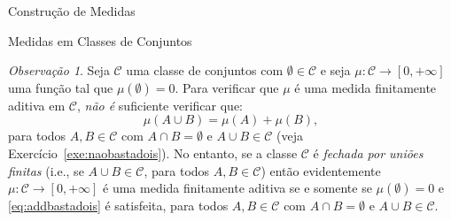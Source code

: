 \documentclass[oneside,final,11pt]{amsbook}
\theoremstyle{remark}\newtheorem{exercise}{Exercício}[chapter]
\theoremstyle{remark}\newtheorem{*exercise}[exercise]{\hbox to 0pt{\hskip 0pt minus 1fil*}Exercício}
\theoremstyle{definition}\newtheorem{exdefin}{Definição}[chapter]
\theoremstyle{plain}\newtheorem{teo}{Teorema}[section]
\theoremstyle{plain}\newtheorem{lem}[teo]{Lema}
\theoremstyle{plain}\newtheorem{prop}[teo]{Proposição}
\theoremstyle{plain}\newtheorem{cor}[teo]{Corolário}
\theoremstyle{definition}\newtheorem{defin}[teo]{Definição}
\theoremstyle{remark}\newtheorem{rem}[teo]{Observação}
\theoremstyle{definition}\newtheorem{notation}[teo]{Notação}
\theoremstyle{definition}\newtheorem{convention}[teo]{Convenção}
\theoremstyle{definition}\newtheorem{example}[teo]{Exemplo}
\numberwithin{section}{chapter}
\numberwithin{equation}{section}
\begin{document}
\begin{chapter}{Construção de Medidas}
\begin{section}{Medidas em Classes de Conjuntos}
\begin{rem}\label{thm:rembastadois}
Seja $\mathcal C$ uma classe de conjuntos com $\emptyset\in\mathcal C$ e seja $\mu:\mathcal C\to[0,+\infty]$
uma função tal que $\mu(\emptyset)=0$. Para verificar que $\mu$ é uma medida finitamente aditiva em $\mathcal C$, {\em não
é\/} suficiente verificar que:
\begin{equation}\label{eq:addbastadois}
\mu(A\cup B)=\mu(A)+\mu(B),
\end{equation}
para todos $A,B\in\mathcal C$ com $A\cap B=\emptyset$ e $A\cup B\in\mathcal C$ (veja Exercício~\ref{exe:naobastadois}).
No entanto, se a classe $\mathcal C$ é
{\em fechada por uniões finitas\/}%
(i.e., se $A\cup B\in\mathcal C$, para todos $A,B\in\mathcal C$) então evidentemente $\mu:\mathcal C\to[0,+\infty]$ é uma medida finitamente aditiva se e somente
se $\mu(\emptyset)=0$ e \eqref{eq:addbastadois} é satisfeita, para todos $A,B\in\mathcal C$ com $A\cap B=\emptyset$ e $A\cup B\in\mathcal C$.
\end{rem}


\end{section}
\end{chapter}
\end{document}
